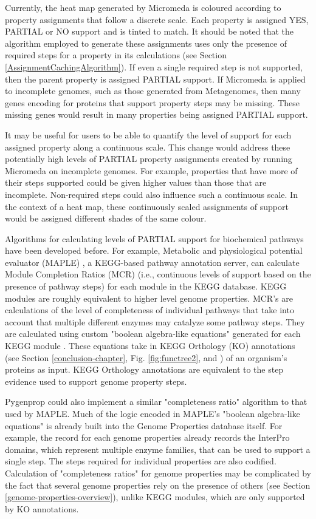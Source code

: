 Currently, the heat map generated by Micromeda is coloured according to property assignments that follow a discrete scale. Each property is assigned YES, PARTIAL or NO support and is tinted to match. It should be noted that the algorithm employed to generate these assignments uses only the presence of required steps for a property in its calculations (see Section \ref{AssignmentCachingAlgorithm}). If even a single required step is not supported, then the parent property is assigned PARTIAL support. If Micromeda is applied to incomplete genomes, such as those generated from Metagenomes, then many genes encoding for proteins that support property steps may be missing. These missing genes would result in many properties being assigned PARTIAL support. 

It may be useful for users to be able to quantify the level of support for each assigned property along a continuous scale. This change would address these potentially high levels of PARTIAL property assignments created by running Micromeda on incomplete genomes. For example, properties that have more of their steps supported could be given higher values than those that are incomplete. Non-required steps could also influence such a continuous scale. In the context of a heat map, these continuously scaled assignments of support would be assigned different shades of the same colour.

Algorithms for calculating levels of PARTIAL support for biochemical pathways have been developed before. For example, Metabolic and physiological potential evaluator (MAPLE) \cite{takami2016automated}, a KEGG-based pathway annotation server, can calculate Module Completion Ratios (MCR) (i.e., continuous levels of support based on the presence of pathway steps) for each module in the KEGG database. KEGG modules are roughly equivalent to higher level genome properties. MCR's are calculations of the level of completeness of individual pathways that take into account that multiple different enzymes may catalyze some pathway steps. They are calculated using custom "boolean algebra-like equations" generated for each KEGG module \cite{takami2012evaluation}. These equations take in KEGG Orthology (KO) annotations (see Section \ref{conclusion-chapter}, Fig. \ref{fig:functree2}, and \cite{mao2005automated}) of an organism's proteins as input. KEGG Orthology annotations are equivalent to the step evidence used to support genome property steps. 

Pygenprop could also implement a similar "completeness ratio" algorithm to that used by MAPLE. Much of the logic encoded in MAPLE's "boolean algebra-like equations" is already built into the Genome Properties database itself. For example, the record for each genome properties already records the InterPro domains, which represent multiple enzyme families, that can be used to support a single step. The steps required for individual properties are also codified. Calculation of "completeness ratios" for genome properties may be complicated by the fact that several genome properties rely on the presence of others (see Section \ref{genome-properties-overview}), unlike KEGG modules, which are only supported by KO annotations.

